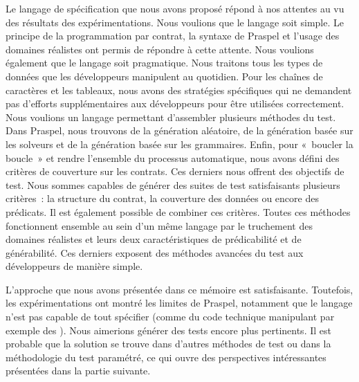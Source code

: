 Le langage de spécification que nous avons proposé répond à nos attentes au vu
des résultats des expérimentations. Nous voulions que le langage soit simple. Le
principe de la programmation par contrat, la syntaxe de Praspel et l'usage des
domaines réalistes ont permis de répondre à cette attente. Nous voulions
également que le langage soit pragmatique. Nous traitons tous les types de
données que les développeurs manipulent au quotidien. Pour les chaînes de
caractères et les tableaux, nous avons des stratégies spécifiques qui ne
demandent pas d'efforts supplémentaires aux développeurs pour être utilisées
correctement. Nous voulions un langage permettant d'assembler plusieurs méthodes
du test. Dans Praspel, nous trouvons de la génération aléatoire, de la
génération basée sur les solveurs et de la génération basée sur les grammaires.
Enfin, pour «~boucler la boucle~» et rendre l'ensemble du processus automatique,
nous avons défini des critères de couverture sur les contrats. Ces derniers nous
offrent des objectifs de test. Nous sommes capables de générer des suites de
test satisfaisants plusieurs critères~: la structure du contrat, la couverture
des données ou encore des prédicats. Il est également possible de combiner ces
critères. Toutes ces méthodes fonctionnent ensemble au sein d'un même langage
par le truchement des domaines réalistes et leurs deux caractéristiques de
prédicabilité et de générabilité. Ces derniers exposent des méthodes avancées du
test aux développeurs de manière simple.

L'approche que nous avons présentée dans ce mémoire est satisfaisante.
Toutefois, les expérimentations ont montré les limites de Praspel, notamment que
le langage n'est pas capable de tout spécifier (comme du code technique
manipulant par exemple des ). Nous aimerions générer des
tests encore plus pertinents. Il est probable que la solution se trouve dans
d'autres méthodes de test ou dans la méthodologie du test paramétré, ce qui
ouvre des perspectives intéressantes présentées dans la partie suivante.

